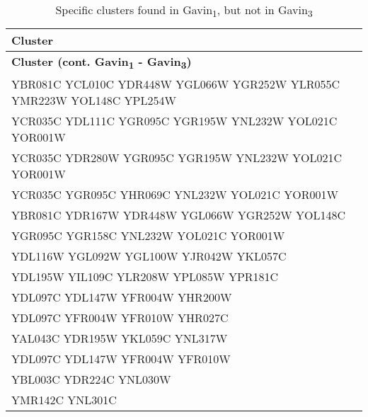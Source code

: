 \setlength{\extrarowheight}{2pt}
\renewcommand{\arraystretch}{1.2}
\begin{longtable}{| m{27em} |}
\caption{Specific clusters found in Gavin\textsubscript{1}, but not in Gavin\textsubscript{3}} \\
\hline
\textbf{Cluster} \\
\hline
\endfirsthead
\hline
\textbf{Cluster (cont. Gavin\textsubscript{1} - Gavin\textsubscript{3})} \\
\hline
\endhead
\hline
\endfoot
\hline
\endlastfoot
YBR081C YCL010C YDR448W YGL066W YGR252W YLR055C YMR223W YOL148C YPL254W \\
\hline
YCR035C YDL111C YGR095C YGR195W YNL232W YOL021C YOR001W \\
\hline
YCR035C YDR280W YGR095C YGR195W YNL232W YOL021C YOR001W \\
\hline
YCR035C YGR095C YHR069C YNL232W YOL021C YOR001W \\
\hline
YBR081C YDR167W YDR448W YGL066W YGR252W YOL148C \\
\hline
YGR095C YGR158C YNL232W YOL021C YOR001W \\
\hline
YDL116W YGL092W YGL100W YJR042W YKL057C \\
\hline
YDL195W YIL109C YLR208W YPL085W YPR181C \\
\hline
YDL097C YDL147W YFR004W YHR200W \\
\hline
YDL097C YFR004W YFR010W YHR027C \\
\hline
YAL043C YDR195W YKL059C YNL317W \\
\hline
YDL097C YDL147W YFR004W YFR010W \\
\hline
YBL003C YDR224C YNL030W \\
\hline
YMR142C YNL301C \\
\hline
\end{longtable}